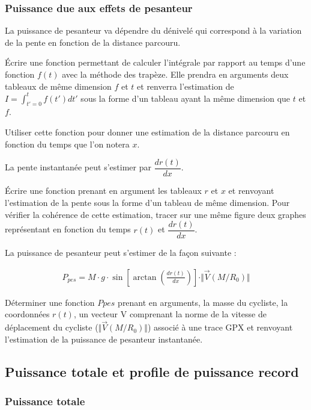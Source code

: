 \subsubsection{Puissance due aux effets de pesanteur}

La puissance de pesanteur va dépendre du dénivelé qui correspond à la variation de la pente en fonction de la distance parcouru.

\question{} Écrire une fonction permettant de calculer l'intégrale par rapport au temps d'une fonction $f(t)$ avec la méthode des trapèze. Elle prendra en arguments deux tableaux de même dimension $f$ et $t$ et renverra l'estimation de $I=\displaystyle{\int_{t'=0}^t}f(t')dt'$ sous la forme d'un tableau ayant la même dimension que $t$ et $f$.

\question{} Utiliser cette fonction pour donner une estimation de la distance parcouru en fonction du temps que l'on notera $x$.

La pente instantanée peut s'estimer par $\dfrac{dr(t)}{dx}$.

\question{} Écrire une fonction prenant en argument les tableaux $r$ et $x$ et renvoyant l'estimation de la pente sous la forme d'un tableau de même dimension. Pour vérifier la cohérence de cette estimation, tracer sur une même figure deux graphes représentant en fonction du temps $r(t)$ et $\dfrac{dr(t)}{dx}$.

La puissance de pesanteur peut s'estimer de la façon suivante : 

\begin{align*}
P_{pes}=M\cdot g \cdot \sin\left[\arctan\left(\frac{dr(t)}{dx}\right)\right]\cdot \Vert \overrightarrow{V}(M/R_0)\Vert 
\end{align*}

\question{} Déterminer une fonction $Ppes$ prenant en arguments, la masse du cycliste, la coordonnées $r(t)$, un vecteur V comprenant la norme de la vitesse de déplacement du cycliste ($\Vert \overrightarrow{V}(M/R_0)\Vert$) associé à une trace GPX et renvoyant l'estimation de la puissance de pesanteur instantanée.  

\subsection{Puissance totale et profile de puissance record}

\subsubsection{Puissance totale}


